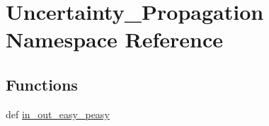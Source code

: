 \hypertarget{namespace_uncertainty___propagation}{\section{Uncertainty\-\_\-\-Propagation Namespace Reference}
\label{namespace_uncertainty___propagation}
}
\subsection*{Functions}
\begin{DoxyCompactItemize}
\item 
def \hyperlink{namespace_uncertainty___propagation_a31def17fb90ec47c42614324e19ea1b3}{in\-\_\-out\-\_\-easy\-\_\-peasy}
\end{DoxyCompactItemize}
